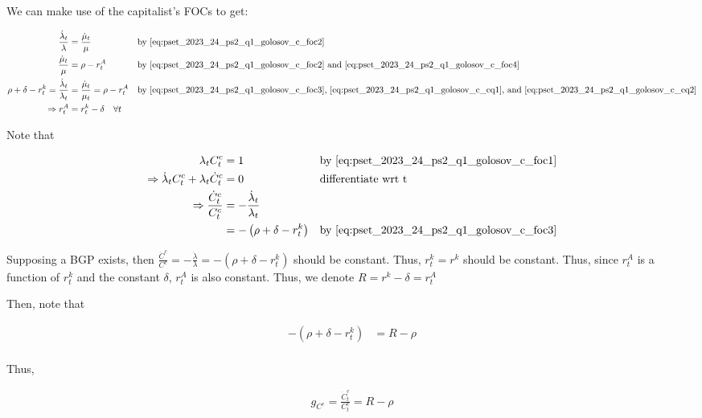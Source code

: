 We can make use of the capitalist's FOCs to get:

\begin{align}
    \frac{\dot{\lambda}_t}{\lambda} &= \frac{\dot{\mu}_t}{\mu} && \text{by \eqref{eq:pset_2023_24_ps2_q1_golosov_c_foc2}} \label{eq:pset_2023_24_ps2_q1_golosov_c_eq1} \\
    \frac{\dot{\mu}_t}{\mu} &= \rho - r_t^A && \text{by \eqref{eq:pset_2023_24_ps2_q1_golosov_c_foc2} and \eqref{eq:pset_2023_24_ps2_q1_golosov_c_foc4}} \label{eq:pset_2023_24_ps2_q1_golosov_c_eq2} \\
    \rho+\delta-r_t^k=\frac{\dot{\lambda}_t}{\lambda_t}&=\frac{\dot{\mu}_t}{\mu_t}=\rho-r_t^A && \text{by \eqref{eq:pset_2023_24_ps2_q1_golosov_c_foc3}, \eqref{eq:pset_2023_24_ps2_q1_golosov_c_eq1}, and \eqref{eq:pset_2023_24_ps2_q1_golosov_c_eq2}} \\
    \Rightarrow r_t^A &= r_t^k - \delta \quad \forall t
\end{align}

Note that 

\begin{align}
    \lambda_t C_t^c &= 1 && \text{by \eqref{eq:pset_2023_24_ps2_q1_golosov_c_foc1}} \\
    \Rightarrow \dot{\lambda}_t C_t^c + \lambda_t \dot{C}_t^c &= 0 && \text{differentiate wrt t} \\
    \Rightarrow \frac{\dot{C}_t^c}{C_t^c}&= -\frac{\dot{\lambda}_t}{\lambda_t} \\
    &= -\left(\rho+\delta-r_t^k\right) && \text{by \eqref{eq:pset_2023_24_ps2_q1_golosov_c_foc3}} \\
\end{align}

Supposing a BGP exists, then 
$\frac{\dot{C}^c}{C^c}=-\frac{\dot{\lambda}}{\lambda}=-\left(\rho+\delta-r_t^k\right)$ 
should be constant. Thus, $r_t^k = r^k$ should be constant. Thus, 
since $r_t^A$ is a function of $r_t^k$ and the constant $\delta$, 
$r_t^A$ is also constant. Thus, we denote 
$R = r^k - \delta = r_t^A$

Then, note that 

\begin{align}
    -\left(\rho+\delta-r_t^k\right) &= R - \rho \\
\end{align}

Thus,

\begin{align}
    g_{C^c} = \frac{\dot{C}_t^c}{C_t^c} = R - \rho \\
\end{align}

